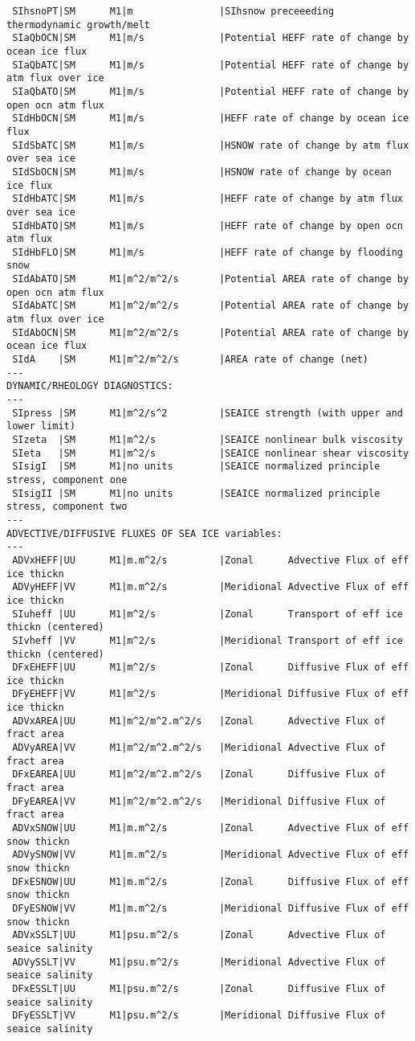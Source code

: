 \begin{table}[!ht]
{\begin{verbatim}
 SIhsnoPT|SM      M1|m               |SIhsnow preceeeding thermodynamic growth/melt
 SIaQbOCN|SM      M1|m/s             |Potential HEFF rate of change by ocean ice flux
 SIaQbATC|SM      M1|m/s             |Potential HEFF rate of change by atm flux over ice
 SIaQbATO|SM      M1|m/s             |Potential HEFF rate of change by open ocn atm flux
 SIdHbOCN|SM      M1|m/s             |HEFF rate of change by ocean ice flux
 SIdSbATC|SM      M1|m/s             |HSNOW rate of change by atm flux over sea ice
 SIdSbOCN|SM      M1|m/s             |HSNOW rate of change by ocean ice flux
 SIdHbATC|SM      M1|m/s             |HEFF rate of change by atm flux over sea ice
 SIdHbATO|SM      M1|m/s             |HEFF rate of change by open ocn atm flux
 SIdHbFLO|SM      M1|m/s             |HEFF rate of change by flooding snow
 SIdAbATO|SM      M1|m^2/m^2/s       |Potential AREA rate of change by open ocn atm flux
 SIdAbATC|SM      M1|m^2/m^2/s       |Potential AREA rate of change by atm flux over ice
 SIdAbOCN|SM      M1|m^2/m^2/s       |Potential AREA rate of change by ocean ice flux
 SIdA    |SM      M1|m^2/m^2/s       |AREA rate of change (net)
---
DYNAMIC/RHEOLOGY DIAGNOSTICS:
---
 SIpress |SM      M1|m^2/s^2         |SEAICE strength (with upper and lower limit)
 SIzeta  |SM      M1|m^2/s           |SEAICE nonlinear bulk viscosity
 SIeta   |SM      M1|m^2/s           |SEAICE nonlinear shear viscosity
 SIsigI  |SM      M1|no units        |SEAICE normalized principle stress, component one
 SIsigII |SM      M1|no units        |SEAICE normalized principle stress, component two
---
ADVECTIVE/DIFFUSIVE FLUXES OF SEA ICE variables:
---
 ADVxHEFF|UU      M1|m.m^2/s         |Zonal      Advective Flux of eff ice thickn
 ADVyHEFF|VV      M1|m.m^2/s         |Meridional Advective Flux of eff ice thickn
 SIuheff |UU      M1|m^2/s           |Zonal      Transport of eff ice thickn (centered)
 SIvheff |VV      M1|m^2/s           |Meridional Transport of eff ice thickn (centered)
 DFxEHEFF|UU      M1|m^2/s           |Zonal      Diffusive Flux of eff ice thickn
 DFyEHEFF|VV      M1|m^2/s           |Meridional Diffusive Flux of eff ice thickn
 ADVxAREA|UU      M1|m^2/m^2.m^2/s   |Zonal      Advective Flux of fract area
 ADVyAREA|VV      M1|m^2/m^2.m^2/s   |Meridional Advective Flux of fract area
 DFxEAREA|UU      M1|m^2/m^2.m^2/s   |Zonal      Diffusive Flux of fract area
 DFyEAREA|VV      M1|m^2/m^2.m^2/s   |Meridional Diffusive Flux of fract area
 ADVxSNOW|UU      M1|m.m^2/s         |Zonal      Advective Flux of eff snow thickn
 ADVySNOW|VV      M1|m.m^2/s         |Meridional Advective Flux of eff snow thickn
 DFxESNOW|UU      M1|m.m^2/s         |Zonal      Diffusive Flux of eff snow thickn
 DFyESNOW|VV      M1|m.m^2/s         |Meridional Diffusive Flux of eff snow thickn
 ADVxSSLT|UU      M1|psu.m^2/s       |Zonal      Advective Flux of seaice salinity
 ADVySSLT|VV      M1|psu.m^2/s       |Meridional Advective Flux of seaice salinity
 DFxESSLT|UU      M1|psu.m^2/s       |Zonal      Diffusive Flux of seaice salinity
 DFyESSLT|VV      M1|psu.m^2/s       |Meridional Diffusive Flux of seaice salinity
\end{verbatim}
}
\caption{Available diagnostics of the seaice-package}
\end{table}
